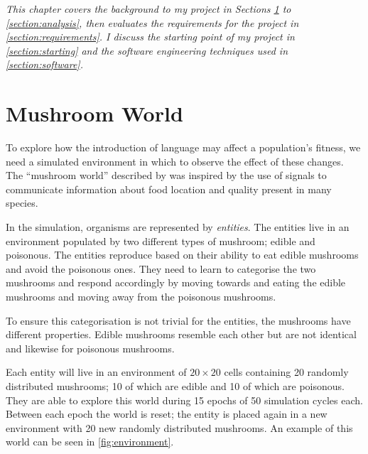 \documentclass[12pt,a4paper]{report}
\begin{document}
\emph{This chapter covers the background to my project in Sections \ref{section:world} to \ref{section:analysis}, then evaluates the requirements for the project in \cref{section:requirements}. I discuss the starting point of my project in \cref{section:starting} and the software engineering techniques used in \cref{section:software}.}

\section{Mushroom World}\label{section:world}

To explore how the introduction of language may affect a population's fitness, we need a simulated environment in which to observe the effect of these changes. The ``mushroom world'' described by \cite{Cangelosi1998} was inspired by the use of signals to communicate information about food location and quality present in many species.

In the simulation, organisms are represented by \emph{entities}. The entities live in an environment populated by two different types of mushroom; edible and poisonous. The entities reproduce based on their ability to eat edible mushrooms and avoid the poisonous ones. They need to learn to categorise the two mushrooms and respond accordingly by moving towards and eating the edible mushrooms and moving away from the poisonous mushrooms.

To ensure this categorisation is not trivial for the entities, the mushrooms have different properties. Edible mushrooms resemble each other but are not identical and likewise for poisonous mushrooms.

Each entity will live in an environment of $20 \times 20$ cells containing 20 randomly distributed mushrooms; 10 of which are edible and 10 of which are poisonous. They are able to explore this world during 15 epochs of 50 simulation cycles each. Between each epoch the world is reset; the entity is placed again in a new environment with 20 new randomly distributed mushrooms. An example of this world can be seen in \cref{fig:environment}.
\end{document}
